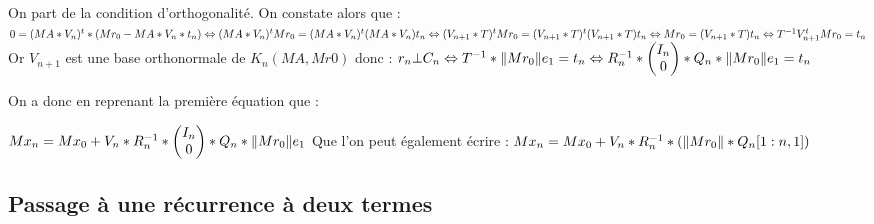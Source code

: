 \documentclass[12 pt]{article}
\begin{document}
On part de la condition d'orthogonalité. On constate alors que :
$ 0 = (MA*V_n)^t*(Mr_0 - MA*V_n*t_n) \\
\Leftrightarrow (MA*V_n)^tMr_0 = (MA*V_n)^t(MA*V_n)t_n  \\
\Leftrightarrow (V_{n+1}*T)^tMr_0 =(V_{n+1}*T)^t(V_{n+1}*T)t_n \\
\Leftrightarrow Mr_0 = (V_{n+1}*T)t_n \\
\Leftrightarrow T^{-1}V_{n+1}^tMr_0 = t_n \\
$ 
Or $V_{n+1}$ est une base orthonormale de $K_n(MA,Mr0)$ donc : 
$ \\ r_n \bot C_n \Leftrightarrow T^{-1}* \Vert Mr_0 \Vert e_1 = t_n  \\
\Leftrightarrow R^{-1}_n*\begin{pmatrix} I_n \\ 0 \end{pmatrix}*Q_n*\Vert Mr_0 \Vert e_1 = t_n $

On a donc en reprenant la première équation que :

$\\ Mx_n = Mx_0 + V_n*R^{-1}_n*\begin{pmatrix} I_n \\ 0 \end{pmatrix}*Q_n*\Vert Mr_0 \Vert e_1 \\$
Que l'on peut également écrire : 
$\\ Mx_n = Mx_0 + V_n*R^{-1}_n*(\Vert Mr_0 \Vert*Q_n[1:n,1])  \\$

\subsection*{Passage à une récurrence à deux termes}
\end{document}
